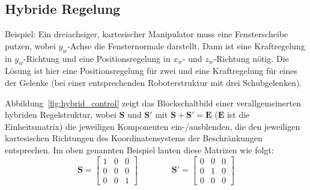 \documentclass[a4paper, 11pt, accentcolor = tud3b]{tudreport}
\newcommand{\mat}[1]{\boldsymbol{#1}}
\begin{document}
			\subsection{Hybride Regelung}
				Beispiel: Ein dreiachsiger, kartesischer Manipulator muss eine Fensterscheibe putzen, wobei \( y_w \)-Achse die Fensternormale darstellt. Dann ist eine Kraftregelung in \(y_w\)-Richtung und eine Positionsregelung in \(x_w\)- und \(z_w\)-Richtung nötig. Die Lösung ist hier eine Positionsregelung für zwei und eine Kraftregelung für eines der Gelenke (bei einer entsprechenden Roboterstruktur mit drei Schubgelenken).
				
				Abbildung~\ref{fig:hybrid_control} zeigt das Blockschaltbild einer verallgemeinerten hybriden Regelstruktur, wobei \( \mat{S} \) und \( \mat{S}' \) mit \( \mat{S} + \mat{S}' = \mat{E} \) (\(\mat{E}\) ist die Einheitsmatrix) die jeweiligen Komponenten ein-/ausblenden, die den jeweiligen kartesischen Richtungen des Koordinatensystems der Beschränkungen entsprechen. Im oben genannten Beispiel lauten diese Matrizen wie folgt:
				\begin{equation*}
					\mat{S} =
						\begin{bmatrix}
							1 & 0 & 0 \\
							0 & 0 & 0 \\
							0 & 0 & 1
						\end{bmatrix}
					\quad\quad\quad\quad
					\mat{S}' =
						\begin{bmatrix}
							0 & 0 & 0 \\
							0 & 1 & 0 \\
							0 & 0 & 0
						\end{bmatrix}
				\end{equation*}
				
\end{document}
